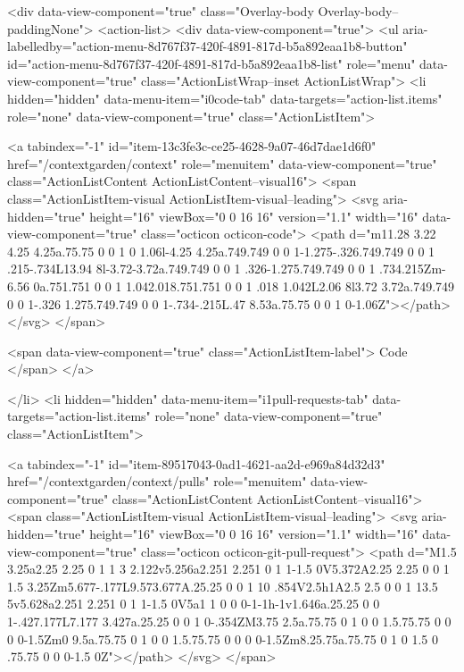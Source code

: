       <div data-view-component="true" class="Overlay-body Overlay-body--paddingNone">          <action-list>
  <div data-view-component="true">
    <ul aria-labelledby="action-menu-8d767f37-420f-4891-817d-b5a892eaa1b8-button" id="action-menu-8d767f37-420f-4891-817d-b5a892eaa1b8-list" role="menu" data-view-component="true" class="ActionListWrap--inset ActionListWrap">
        <li hidden="hidden" data-menu-item="i0code-tab" data-targets="action-list.items" role="none" data-view-component="true" class="ActionListItem">
    
    
    <a tabindex="-1" id="item-13c3fe3c-ce25-4628-9a07-46d7dae1d6f0" href="/contextgarden/context" role="menuitem" data-view-component="true" class="ActionListContent ActionListContent--visual16">
        <span class="ActionListItem-visual ActionListItem-visual--leading">
          <svg aria-hidden="true" height="16" viewBox="0 0 16 16" version="1.1" width="16" data-view-component="true" class="octicon octicon-code">
    <path d="m11.28 3.22 4.25 4.25a.75.75 0 0 1 0 1.06l-4.25 4.25a.749.749 0 0 1-1.275-.326.749.749 0 0 1 .215-.734L13.94 8l-3.72-3.72a.749.749 0 0 1 .326-1.275.749.749 0 0 1 .734.215Zm-6.56 0a.751.751 0 0 1 1.042.018.751.751 0 0 1 .018 1.042L2.06 8l3.72 3.72a.749.749 0 0 1-.326 1.275.749.749 0 0 1-.734-.215L.47 8.53a.75.75 0 0 1 0-1.06Z"></path>
</svg>
        </span>
      
        <span data-view-component="true" class="ActionListItem-label">
          Code
</span>      
</a>
  
</li>
        <li hidden="hidden" data-menu-item="i1pull-requests-tab" data-targets="action-list.items" role="none" data-view-component="true" class="ActionListItem">
    
    
    <a tabindex="-1" id="item-89517043-0ad1-4621-aa2d-e969a84d32d3" href="/contextgarden/context/pulls" role="menuitem" data-view-component="true" class="ActionListContent ActionListContent--visual16">
        <span class="ActionListItem-visual ActionListItem-visual--leading">
          <svg aria-hidden="true" height="16" viewBox="0 0 16 16" version="1.1" width="16" data-view-component="true" class="octicon octicon-git-pull-request">
    <path d="M1.5 3.25a2.25 2.25 0 1 1 3 2.122v5.256a2.251 2.251 0 1 1-1.5 0V5.372A2.25 2.25 0 0 1 1.5 3.25Zm5.677-.177L9.573.677A.25.25 0 0 1 10 .854V2.5h1A2.5 2.5 0 0 1 13.5 5v5.628a2.251 2.251 0 1 1-1.5 0V5a1 1 0 0 0-1-1h-1v1.646a.25.25 0 0 1-.427.177L7.177 3.427a.25.25 0 0 1 0-.354ZM3.75 2.5a.75.75 0 1 0 0 1.5.75.75 0 0 0 0-1.5Zm0 9.5a.75.75 0 1 0 0 1.5.75.75 0 0 0 0-1.5Zm8.25.75a.75.75 0 1 0 1.5 0 .75.75 0 0 0-1.5 0Z"></path>
</svg>
        </span>
      
